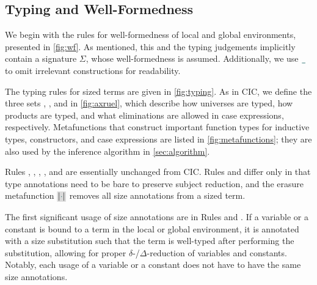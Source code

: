 \subsection{Typing and Well-Formedness}\label{sec:typing:rules}



We begin with the rules for well-formedness of local and global environments, presented in \autoref{fig:wf}.
As mentioned, this and the typing judgements implicitly contain a signature $\Sigma$, whose well-formedness is assumed.
Additionally, we use $\any$ to omit irrelevant constructions for readability.







The typing rules for sized terms are given in \autoref{fig:typing}. As in CIC, we define the three sets \Axioms, \Rules, and \Elims in \autoref{fig:axruel}, which describe how universes are typed, how products are typed, and what eliminations are allowed in case expressions, respectively.
Metafunctions that construct important function types for inductive types, constructors, and case expressions are listed in \autoref{fig:metafunctions}; they are also used by the inference algorithm in \autoref{sec:algorithm}.

Rules , , ,  , and  are essentially unchanged from CIC.
Rules  and  differ only in that type annotations need to be bare to preserve subject reduction,
and the erasure metafunction $\new{\erase{\ph}}$ removes all size annotations from a sized term.

The first significant usage of size annotations are in Rules  and .
If a variable or a constant is bound to a term in the local or global environment, it is annotated with a size substitution such that the term is well-typed after performing the substitution, allowing for proper $\delta$-/$\Delta$-reduction of variables and constants.
Notably, each usage of a variable or a constant does not have to have the same size annotations.

